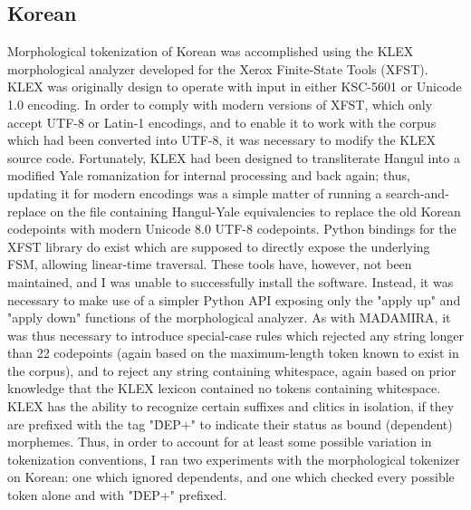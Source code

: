 \subsection{Korean}
Morphological tokenization of Korean was accomplished using the KLEX morphological analyzer developed for the Xerox Finite-State Tools (XFST). KLEX was originally design to operate with input in either KSC-5601 or Unicode 1.0 encoding. In order to comply with modern versions of XFST, which only accept UTF-8 or Latin-1 encodings, and to enable it to work with the corpus which had been converted into UTF-8, it was necessary to modify the KLEX source code. Fortunately, KLEX had been designed to transliterate Hangul into a modified Yale romanization for internal processing and back again; thus, updating it for modern encodings was a simple matter of running a search-and-replace on the file containing Hangul-Yale equivalencies to replace the old Korean codepoints with modern Unicode 8.0 UTF-8 codepoints.
Python bindings for the XFST library do exist which are supposed to directly expose the underlying FSM, allowing linear-time traversal. These tools have, however, not been maintained, and I was unable to successfully install the software. Instead, it was necessary to make use of a simpler Python API exposing only the "apply up" and "apply down" functions of the morphological analyzer. As with MADAMIRA, it was thus necessary to introduce special-case rules which rejected any string longer than 22 codepoints (again based on the maximum-length token known to exist in the corpus), and to reject any string containing whitespace, again based on prior knowledge that the KLEX lexicon contained no tokens containing whitespace.
KLEX has the ability to recognize certain suffixes and clitics in isolation, if they are prefixed with the tag "\^DEP+" to indicate their status as bound (dependent) morphemes. Thus, in order to account for at least some possible variation in tokenization conventions, I ran two experiments with the morphological tokenizer on Korean: one which ignored dependents, and one which checked every possible token alone and with "\^DEP+" prefixed.

